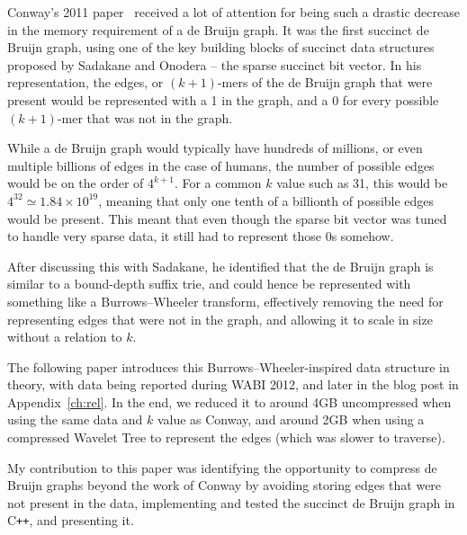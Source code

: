 Conway's 2011 paper~\cite{conway} received a lot of attention for being such a drastic decrease in the memory requirement of a de Bruijn graph. It was the first succinct de Bruijn graph, using one of the key building blocks of succinct data structures proposed by Sadakane and Onodera -- the sparse succinct bit vector. In his representation, the edges, or $(k+1)$-mers of the de Bruijn graph that were present would be represented with a 1 in the graph, and a 0 for every possible $(k+1)$-mer that was not in the graph.

While a de Bruijn graph would typically have hundreds of millions, or even multiple billions of edges in the case of humans, the number of possible edges would be on the order of $4^{k+1}$. For a common $k$ value such as 31, this would be $4^{32} \simeq 1.84 \times 10^{19}$, meaning that only one tenth of a billionth of possible edges would be present. This meant that even though the sparse bit vector was tuned to handle very sparse data, it still had to represent those 0s somehow.

After discussing this with Sadakane, he identified that the de Bruijn graph is similar to a bound-depth suffix trie, and could hence be represented with something like a Burrows--Wheeler transform, effectively removing the need for representing edges that were not in the graph, and allowing it to scale in size without a relation to $k$.

The following paper introduces this Burrows--Wheeler-inspired data structure in theory, with data being reported during WABI 2012, and later in the blog post in Appendix~\ref{ch:rel}. In the end, we reduced it to around 4GB uncompressed when using the same data and $k$ value as Conway, and around 2GB when using a compressed Wavelet Tree to represent the edges (which was slower to traverse).

My contribution to this paper was identifying the opportunity to compress de Bruijn graphs beyond the work of Conway by avoiding storing edges that were not present in the data, implementing and tested the succinct de Bruijn graph in C\texttt{++}, and presenting it.

